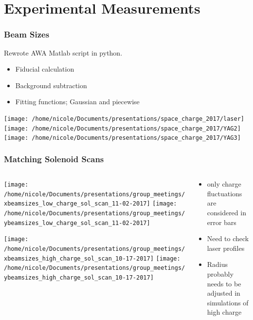 \documentclass[professionalfonts,t]{beamer}
\begin{document}
\section{Experimental Measurements}

\begin{frame}
\frametitle{Beam Sizes}
Rewrote AWA Matlab script in python.
\begin{itemize}
	\item Fiducial calculation
	\item Background subtraction 
	\item Fitting functions; Gaussian and piecewise
\end{itemize}	

\vspace{1em}
\centering
\texttt{[image: /home/nicole/Documents/presentations/space\_charge\_2017/laser]}%
\texttt{[image: /home/nicole/Documents/presentations/space\_charge\_2017/YAG2]}%
\texttt{[image: /home/nicole/Documents/presentations/space\_charge\_2017/YAG3]}
\end{frame}

\begin{frame}[t]
\frametitle{Matching Solenoid Scans}
\begin{columns}[T]
\begin{column}{0.76\textwidth}
\begin{minipage}{0.5\textheight}
	\texttt{[image: /home/nicole/Documents/presentations/group\_meetings/xbeamsizes\_low\_charge\_sol\_scan\_11-02-2017]}	\texttt{[image: /home/nicole/Documents/presentations/group\_meetings/ybeamsizes\_low\_charge\_sol\_scan\_11-02-2017]}
\end{minipage}
\begin{minipage}{0.5\textheight}
	\texttt{[image: /home/nicole/Documents/presentations/group\_meetings/xbeamsizes\_high\_charge\_sol\_scan\_10-17-2017]}
	\texttt{[image: /home/nicole/Documents/presentations/group\_meetings/ybeamsizes\_high\_charge\_sol\_scan\_10-17-2017]}
\end{minipage}
\end{column}
\begin{column}{0.4\textwidth}
\begin{itemize}
	\item only charge fluctuations are considered in error bars
	\item Need to check laser profiles  
	\item Radius probably needs to be adjusted in simulations of high charge
\end{itemize}
\end{column}
\end{columns}
\end{frame}
\end{document}
